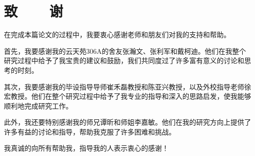 ﻿\renewcommand{\baselinestretch}{1.5}
\fontsize{12pt}{13pt}\selectfont
{}
\chapter*{致~~~~谢}

在完成本篇论文的过程中，我要衷心感谢老师和朋友们对我的支持和帮助。

首先，我要感谢我的云天苑306A的舍友张瀚文、张利军和戴柯迪。他们在我整个研究过程中给予了我宝贵的建议和鼓励，我们共同度过了许多富有意义的讨论和思考的时刻。

其次，我要感谢我的毕设指导导师崔禾磊教授和陈亚兴教授，以及外校指导老师徐宏教授。他们在整个研究过程中给予了我专业的指导和深入的思路启发，使我能够顺利地完成研究工作。

此外，我还要特别感谢我的师兄谭昕和师姐李嘉敏。他们在我的研究方向上提供了许多有益的讨论和指导，帮助我克服了许多困难和挑战。

我真诚的向所有帮助我，指导我的人表示衷心的感谢！

\clearpage
\endinput